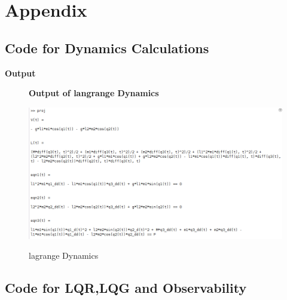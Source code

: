 \documentclass[12pt]{article}
\begin{document}
\section{Appendix}
\subsection{Code for Dynamics Calculations}


\textbf{Output}
\begin{figure}[H]
    \centering
    \textbf{Output of langrange Dynamics}\par\medskip
    \includegraphics[scale = 0.5]{lagrange.png}\\[0.0 cm]	%
    \caption{lagrange Dynamics} 
\end{figure}

\subsection{Code for LQR,LQG and Observability}


\end{document}

